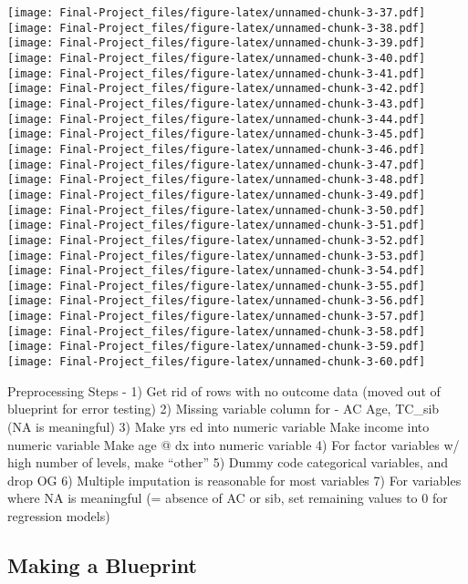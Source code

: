 \documentclass[
]{article}
\begin{document}
\texttt{[image: Final-Project\_files/figure-latex/unnamed-chunk-3-37.pdf]}
\texttt{[image: Final-Project\_files/figure-latex/unnamed-chunk-3-38.pdf]}
\texttt{[image: Final-Project\_files/figure-latex/unnamed-chunk-3-39.pdf]}
\texttt{[image: Final-Project\_files/figure-latex/unnamed-chunk-3-40.pdf]}
\texttt{[image: Final-Project\_files/figure-latex/unnamed-chunk-3-41.pdf]}
\texttt{[image: Final-Project\_files/figure-latex/unnamed-chunk-3-42.pdf]}
\texttt{[image: Final-Project\_files/figure-latex/unnamed-chunk-3-43.pdf]}
\texttt{[image: Final-Project\_files/figure-latex/unnamed-chunk-3-44.pdf]}
\texttt{[image: Final-Project\_files/figure-latex/unnamed-chunk-3-45.pdf]}
\texttt{[image: Final-Project\_files/figure-latex/unnamed-chunk-3-46.pdf]}
\texttt{[image: Final-Project\_files/figure-latex/unnamed-chunk-3-47.pdf]}
\texttt{[image: Final-Project\_files/figure-latex/unnamed-chunk-3-48.pdf]}
\texttt{[image: Final-Project\_files/figure-latex/unnamed-chunk-3-49.pdf]}
\texttt{[image: Final-Project\_files/figure-latex/unnamed-chunk-3-50.pdf]}
\texttt{[image: Final-Project\_files/figure-latex/unnamed-chunk-3-51.pdf]}
\texttt{[image: Final-Project\_files/figure-latex/unnamed-chunk-3-52.pdf]}
\texttt{[image: Final-Project\_files/figure-latex/unnamed-chunk-3-53.pdf]}
\texttt{[image: Final-Project\_files/figure-latex/unnamed-chunk-3-54.pdf]}
\texttt{[image: Final-Project\_files/figure-latex/unnamed-chunk-3-55.pdf]}
\texttt{[image: Final-Project\_files/figure-latex/unnamed-chunk-3-56.pdf]}
\texttt{[image: Final-Project\_files/figure-latex/unnamed-chunk-3-57.pdf]}
\texttt{[image: Final-Project\_files/figure-latex/unnamed-chunk-3-58.pdf]}
\texttt{[image: Final-Project\_files/figure-latex/unnamed-chunk-3-59.pdf]}
\texttt{[image: Final-Project\_files/figure-latex/unnamed-chunk-3-60.pdf]}

Preprocessing Steps - 1) Get rid of rows with no outcome data (moved out
of blueprint for error testing) 2) Missing variable column for - AC Age,
TC\_sib (NA is meaningful) 3) Make yrs ed into numeric variable Make
income into numeric variable Make age @ dx into numeric variable 4) For
factor variables w/ high number of levels, make ``other'' 5) Dummy code
categorical variables, and drop OG 6) Multiple imputation is reasonable
for most variables 7) For variables where NA is meaningful (= absence of
AC or sib, set remaining values to 0 for regression models)

\hypertarget{making-a-blueprint}{%
\subsection{Making a Blueprint}\label{making-a-blueprint}}
\end{document}
